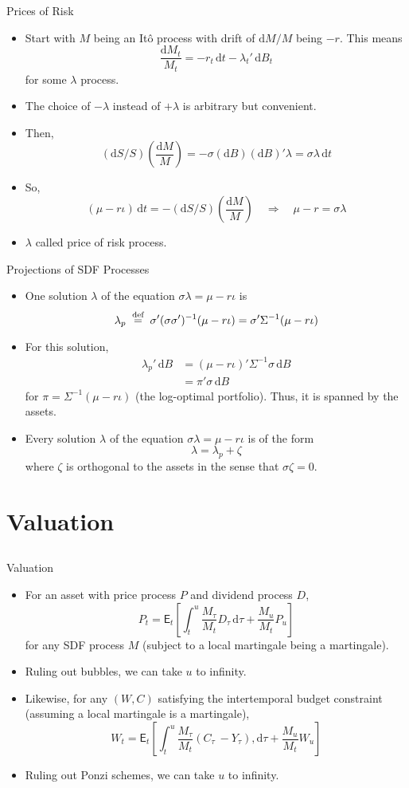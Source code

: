 \documentclass[10pt]{beamer}
\newcommand{\bi}{\begin{itemize}}
\newcommand{\ei}{\end{itemize}}
\newcommand{\im}{\item}
\newcommand{\D}{\mathrm{d}}
\newcommand{\mye}{\ensuremath{\mathsf{E}}}
\newcommand{\eqdef}{\;\buildrel \text{d{}ef}\over = \;}
\begin{document}
 \begin{frame}{Prices of Risk}
    \bi 
    \im Start with $M$ being an It\^o process with drift of $\D M/M$ being $-r$.  This means
    $$\frac{\D M_t}{M_t} = - r_t\,\D t - \lambda_t'\,\D B_t$$
    for some $\lambda$ process.
    \im The choice of $-\lambda$ instead of $+\lambda$ is arbitrary but convenient.
    \im Then,
    $$(\D S/S)\left(\frac{\D M}{M} \right) = -\sigma (\D B) (\D B)'\lambda = \sigma \lambda \,\D t$$
    \im So,
    $$ (\mu-r\iota)\,\D t = -(\D S/S)\left(\frac{\D M}{M} \right) \quad \Rightarrow \quad \mu - r = \sigma \lambda$$
    \im $\lambda$ called price of risk process.
    \ei
  \end{frame}

\begin{frame}{Projections of SDF Processes}
    \bi 
    \im 
 One solution $\lambda$ of the equation $\sigma\lambda = \mu-r\iota$ is 
$$\lambda_p \eqdef \sigma'(\sigma\sigma')^{-1}(\mu-r\iota) = \sigma'\Sigma^{-1}(\mu-r\iota)$$
 \im For this solution,
\begin{align*}
\lambda_p'\,\D B &= (\mu-r\iota)'\Sigma^{-1}\sigma\,\D B\\
&= \pi'\sigma\,\D B
\end{align*}
for $\pi = \Sigma^{-1}(\mu-r\iota)$ (the log-optimal portfolio).  Thus, it is spanned by the assets.
\im 
 Every solution $\lambda$ of the equation $\sigma\lambda = \mu-r\iota$ is of the form
$$\lambda = \lambda_p + \zeta$$
where $\zeta$ is orthogonal to the assets in the sense that $\sigma\zeta=0$.
\ei
\end{frame}

\section{Valuation}\subsection{}

\begin{frame}{Valuation}
\bi 
\im 
For an asset with price process $P$ and dividend process $D$,
$$P_t = \mye_t \left[\int_t^u \frac{M_\tau}{M_t}D_\tau\,\D \tau + \frac{M_u}{M_t}P_u\right]$$
for any SDF process $M$ (subject to a local martingale being a martingale).
\im Ruling out bubbles, we can take $u$ to infinity.
\im Likewise, for any $(W, C)$ satisfying the intertemporal budget constraint (assuming a local martingale is a martingale),
$$W_t = \mye_t \left[\int_t^u \frac{M_\tau}{M_t}(C_\tau\ - Y_\tau),\D \tau + \frac{M_u}{M_t}W_u\right]$$
\im Ruling out Ponzi schemes, we can take $u$ to infinity.
\ei
\end{frame}
\end{document}
